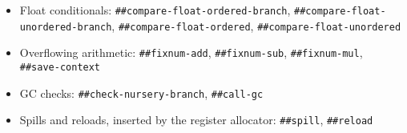 \begin{itemize}
\item
\begin{flushleft}
Float conditionals:
\Verb|##compare-float-ordered-branch|,
\Verb|##compare-float-unordered-branch|,
\Verb|##compare-float-ordered|,
\Verb|##compare-float-unordered|
\end{flushleft}

\item
\begin{flushleft}
Overflowing arithmetic:
\Verb|##fixnum-add|,
\Verb|##fixnum-sub|,
\Verb|##fixnum-mul|,
\Verb|##save-context|
\end{flushleft}

\item
\begin{flushleft}
\Gls{GC} checks:
\Verb|##check-nursery-branch|,
\Verb|##call-gc|
\end{flushleft}

\item
\begin{flushleft}
Spills and reloads, inserted by the register allocator:
\Verb|##spill|,
\Verb|##reload|
\end{flushleft}
\end{itemize}
